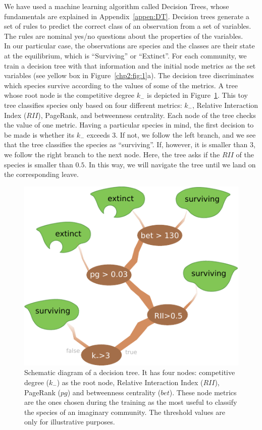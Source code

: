 We have used a machine learning algorithm called Decision Trees,  whose fundamentals are explained in Appendix~\ref{appen:DT}. Decision trees generate a set of rules to predict the correct class of an observation from a set of variables. The rules are nominal yes/no questions about the properties of the variables.  \\

In our particular case, the observations are species and the classes are their state at the equilibrium, which is ``Surviving'' or ``Extinct''. For each community, we train a decision tree with that information and the initial node metrics as the set variables (see yellow box in Figure~\ref{chp2:fig:1}a).  The decision tree discriminates which species survive according to the values of some of the metrics. A tree whose root node is the competitive degree $k_-$ is depicted in Figure~\ref{chp2:fig:2}. This toy tree classifies species only based on four different metrics: $k_-$, Relative Interaction Index ($RII$), PageRank, and betweenness centrality.  Each node of the tree checks the value of one metric. Having a particular species in mind, the first decision to be made is whether its $k_-$ exceeds $3$. If not, we follow the left branch, and we see that the tree classifies the species as ``surviving''. If, however, it is smaller than $3$, we follow the right branch to the next node. Here, the tree asks if the $RII$ of the species is smaller than $0.5$. In this way, we will navigate the tree until we land on the corresponding leave. \\

\begin{figure}[t]
    \centering
    \includegraphics{figures/chp2/fig_2.pdf}
    \caption[Schematic diagram of a decision tree]{Schematic diagram of a decision tree. It has four nodes: competitive degree ($k_-$) as the root node, Relative Interaction Index ($RII$), PageRank ($pg$) and betweenness centrality ($bet$). These node metrics are the ones chosen during the training as the most useful to classify the species of an imaginary community. The threshold values are only for illustrative purposes.}
    \label{chp2:fig:2}
\end{figure}

